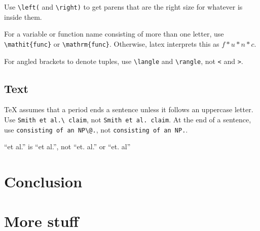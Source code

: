 \documentclass[11pt,leqno]{report}
\begin{document}
Use \verb|\left(| and \verb|\right)| to get parens that are the right size for whatever is inside them.

For a variable or function name consisting of more than one letter, use \verb|\mathit{func}| or \verb|\mathrm{func}|.  Otherwise, latex interprets this as $f*u*n*c$.

For angled brackets to denote tuples, use \verb|\langle| and \verb|\rangle|, not \verb|<| and \verb|>|.

\section{Text}

TeX assumes that a period ends a sentence unless it follows an uppercase letter.
Use \verb|Smith et al.\ claim|, not \verb|Smith et al. claim|.
At the end of a sentence, use \verb|consisting of an NP\@.|, not \verb|consisting of an NP.|.

``et al.'' is ``et al.'', not ``et. al.'' or ``et. al''

\chapter{Conclusion}




\appendix
\chapter{More stuff}
\end{document}
